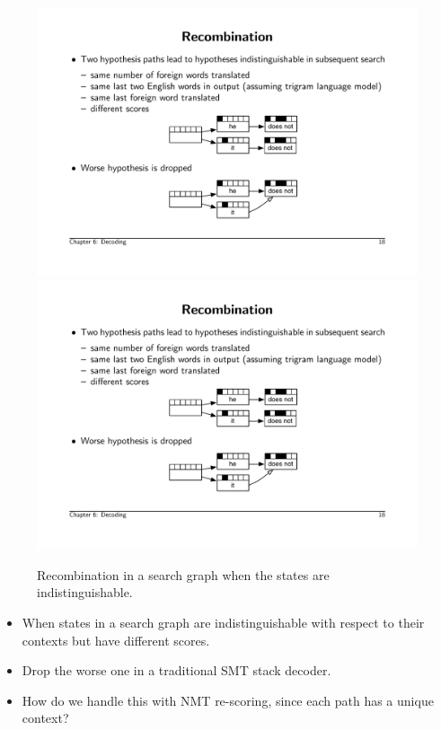 \documentclass[landscape]{jhuslides3C}
\begin{document}
\begin{figure}
\begin{center}
\includegraphics[scale=1]{images/recombination1.pdf}\\
\includegraphics[scale=1]{images/recombination2.pdf}
\caption{Recombination in a search graph when the states are indistinguishable.}
\end{center}
\end{figure}
\begin{itemize}
\item When states in a search graph are indistinguishable with respect to their contexts but have different scores.
\item Drop the worse one in a traditional SMT stack decoder.
\item How do we handle this with NMT re-scoring, since each path has a unique context?
\end{itemize}
\end{document}
